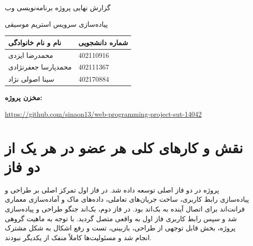 \documentclass[12pt,a4paper]{article}
\newcommand{\eng}[1]{\lr{#1}}
\begin{document}

\begin{titlepage}
    \centering
    \vspace*{2cm}

    {\titr\Huge گزارش نهایی پروژه برنامه‌نویسی وب\par}
    \vspace{0.8cm}
    {\titr\Large پیاده‌سازی سرویس استریم موسیقی\par}

    \vspace{1.5cm}

    \begin{tabular}{>{\raggedleft\arraybackslash}p{7cm} p{4cm}}
        \textbf{نام و نام خانوادگی} & \textbf{شماره دانشجویی} \\ \hline
        محمدرضا ایزدی & 402110916 \\
        محمدپارسا جعفرنژادی & 402111367 \\
        سینا اصولی نژاد & 402170884 \\
    \end{tabular}

    \vfill

    \textbf{مخزن پروژه:}\\
    \begin{LTR}
    \url{https://github.com/sinaon13/web-programming-project-sut-14042}
    \end{LTR}

    \vspace{1cm}
\end{titlepage}

\tableofcontents
\newpage

\section{نقش و کارهای کلی هر عضو در هر یک از دو فاز}

پروژه در دو فاز اصلی توسعه داده شد. در فاز اول تمرکز اصلی بر طراحی و پیاده‌سازی رابط کاربری، ساخت جریان‌های تعاملی، داده‌های ماک و آماده‌سازی معماری فرانت‌اند برای اتصال آینده به بک‌اند بود. در فاز دوم، بک‌اند جنگو طراحی و پیاده‌سازی شد و سپس رابط کاربری فاز اول به \eng{API} واقعی متصل گردید. با توجه به ماهیت گروهی پروژه، بخش قابل توجهی از طراحی، بازبینی، تست و رفع اشکال به شکل مشترک انجام شد و مسئولیت‌ها کاملاً منفک از یکدیگر نبودند.
\end{document}
